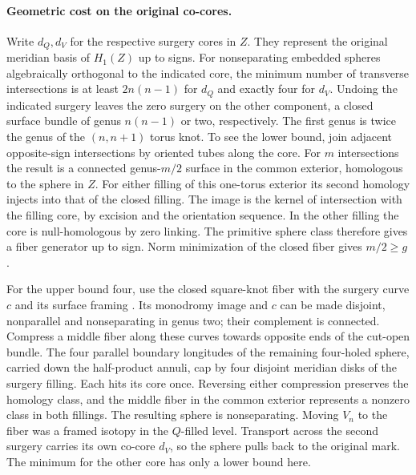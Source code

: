 \documentclass[11pt,letterpaper]{article}
\numberwithin{equation}{section}
\theoremstyle{remark}
\begin{document}
\paragraph{Geometric cost on the original co-cores.}
Write \(d_Q,d_V\) for the respective surgery cores in \(Z\). They
represent the original meridian basis of \(H_1(Z)\) up to signs. For
nonseparating embedded spheres algebraically orthogonal to the indicated
core, the minimum number of transverse intersections is at least
\(2n(n-1)\) for \(d_Q\) and exactly four for \(d_V\). Undoing the
indicated surgery leaves the zero surgery on the other component, a closed
surface bundle of genus \(n(n-1)\) or two, respectively. The first genus
is twice the genus of the \((n,n+1)\) torus knot.
To see the lower bound, join adjacent opposite-sign intersections by
oriented tubes along the core. For \(m\) intersections the result is
a connected genus-\(m/2\) surface in the common exterior, homologous
to the sphere in \(Z\). For either filling of this one-torus exterior
its second homology injects into that of the closed filling. The image
is the kernel of intersection with the filling core, by excision and
the orientation sequence. In the other filling the core is
null-homologous by zero linking. The primitive sphere class therefore
gives a fiber generator up to sign. Norm minimization of the closed
fiber gives \(m/2\ge g\) \cite[Theorem 3]{Thurston1986ManifoldNorm}.

For the upper bound four, use the closed square-knot fiber with the
surgery curve \(c\) and its surface framing
\cite[Proposition 5.2 and Corollaries 5.4, 6.4]{GompfScharlemannThompson2010}.
Its monodromy image and \(c\) can be made disjoint, nonparallel
and nonseparating in genus two; their complement is connected.
Compress a middle fiber along these curves towards opposite ends of
the cut-open bundle. The four parallel boundary longitudes of the
remaining four-holed sphere, carried down the half-product annuli,
cap by four disjoint meridian disks of the surgery filling. Each hits
its core once. Reversing either compression preserves the homology
class, and the middle fiber in the common exterior represents a
nonzero class in both fillings. The resulting sphere is nonseparating.
Moving \(V_n\) to the fiber was a framed isotopy in the \(Q\)-filled
level. Transport across the second surgery carries its own co-core
\(d_V\), so the sphere pulls back to the original mark. The minimum
for the other core has only a lower bound here.
\end{document}
